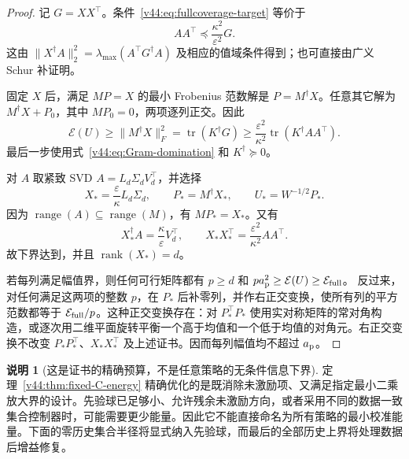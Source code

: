 \documentclass[11pt,a4paper]{article}
\numberwithin{equation}{section}
\theoremstyle{definition}
\newtheorem{remark}[theorem]{说明}
\begin{document}
\begin{proof}
记 $G=XX^\top$。条件~\eqref{v44:eq:fullcoverage-target} 等价于
\begin{equation}
 AA^\top\preceq\frac{\kappa^2}{\varepsilon^2}G.
 \label{v44:eq:Gram-domination}
\end{equation}
这由 $\|X^\dagger A\|_2^2=\lambda_{\max}(A^\top G^\dagger A)$ 及相应的值域条件得到；也可直接由广义 Schur 补证明。

固定 $X$ 后，满足 $MP=X$ 的最小 Frobenius 范数解是 $P=M^\dagger X$。任意其它解为 $M^\dagger X+P_0$，其中 $MP_0=0$，两项逐列正交。因此
\begin{equation}
 \mathcal E(U)\ge\|M^\dagger X\|_F^2
 =\operatorname{tr}(K^\dagger G)
 \ge\frac{\varepsilon^2}{\kappa^2}
       \operatorname{tr}(K^\dagger AA^\top).
 \label{v44:eq:fixed-energy-lower}
\end{equation}
最后一步使用式~\eqref{v44:eq:Gram-domination} 和 $K^\dagger\succeq0$。

对 $A$ 取紧致 SVD $A=L_d\Sigma_d V_d^\top$，并选择
\begin{equation}
 X_* =\frac{\varepsilon}{\kappa}L_d\Sigma_d,
 \qquad P_*=M^\dagger X_*,
 \qquad U_*=W^{-1/2}P_*.
 \label{v44:eq:energy-optimal-probes}
\end{equation}
因为 $\operatorname{range}(A)\subseteq\operatorname{range}(M)$，有 $MP_*=X_*$。又有
\begin{equation}
 X_*^\dagger A=\frac{\kappa}{\varepsilon}V_d^\top,
 \qquad X_*X_*^\top=\frac{\varepsilon^2}{\kappa^2}AA^\top.
\end{equation}
故下界达到，并且 $\operatorname{rank}(X_*)=d$。

若每列满足幅值界，则任何可行矩阵都有
$p\ge d$ 和 $p a_{\rm p}^2\ge\mathcal E(U)\ge\mathcal E_{\rm full}$。
反过来，对任何满足这两项的整数 $p$，在 $P_*$ 后补零列，并作右正交变换，使所有列的平方范数都等于 $\mathcal E_{\rm full}/p$。这种正交变换存在：对 $P_*^\top P_*$ 使用实对称矩阵的常对角构造，或逐次用二维平面旋转平衡一个高于均值和一个低于均值的对角元。右正交变换不改变 $P_*P_*^\top$、$X_*X_*^\top$ 及上述证书。因而每列幅值均不超过 $a_{\rm p}$。
\end{proof}

\begin{remark}[这是证书的精确预算，不是任意策略的无条件信息下界]
\label{v44:rem:fullcoverage-scope}
定理~\ref{v44:thm:fixed-C-energy} 精确优化的是既消除未激励项、又满足指定最小二乘放大界的设计。先验球已足够小、允许残余未激励方向，或者采用不同的数据一致集合控制器时，可能需要更少能量。因此它不能直接命名为所有策略的最小校准能量。下面的零历史集合半径将显式纳入先验球，而最后的全部历史上界将处理数据后增益修复。
\end{remark}
\end{document}
